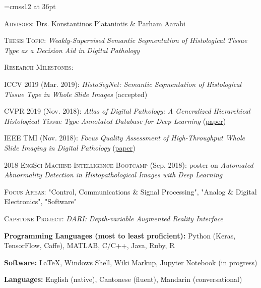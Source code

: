 \documentclass[12pt]{cv_style}
\begin{document}
\font\titlefont=cmss12 at 36pt


\flushleft{}
\begin{ditem}
	\item \textsc{Advisors:} Drs. Konstantinos Plataniotis \& Parham Aarabi
	\item \textsc{Thesis Topic:} \textit{Weakly-Supervised Semantic Segmentation of Histological Tissue Type as a Decision Aid in Digital Pathology}
	\item \textsc{Research Milestones:}
	\begin{ditem}
		\item \textsc{ICCV 2019} (Mar. 2019): \emph{HistoSegNet: Semantic Segmentation of Histological Tissue Type
in Whole Slide Images} (accepted)
		\item \textsc{CVPR 2019} (Nov. 2018): \emph{Atlas of Digital Pathology: A Generalized Hierarchical Histological Tissue Type-Annotated Database for Deep Learning} (\href{http://openaccess.thecvf.com/content_CVPR_2019/html/Hosseini_Atlas_of_Digital_Pathology_A_Generalized_Hierarchical_Histological_Tissue_Type-Annotated_CVPR_2019_paper.html}{paper})
		\item \textsc{IEEE TMI} (Nov. 2018): \emph{Focus Quality Assessment of High-Throughput Whole Slide Imaging in Digital Pathology} (\href{https://arxiv.org/abs/1811.06038}{paper})
		\item \textsc{2018 EngSci Machine Intelligence Bootcamp} (Sep. 2018): poster on \emph{Automated Abnormality Detection in Histopathological Images with Deep Learning}
	\end{ditem}
\end{ditem}
\medspace
{}
\begin{ditem}
	\item \textsc{Focus Areas:} "Control, Communications \& Signal Processing", "Analog \& Digital Electronics", "Software"
	\item \textsc{Capstone Project:} \textit{DARI: Depth-variable Augmented Reality Interface}	
\end{ditem}

\begin{ditem}
	\item \textbf{Programming Languages (most to least proficient):} Python (Keras, TensorFlow, Caffe), MATLAB, C/C++, Java, Ruby, R
	\item \textbf{Software:} \LaTeX, Windows Shell, Wiki Markup, Jupyter Notebook (in progress)
	\item \textbf{Languages:} English (native), Cantonese (fluent), Mandarin (conversational)
\end{ditem}
\end{document}
